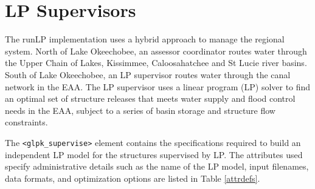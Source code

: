 \section{LP Supervisors}

The runLP implementation uses a hybrid approach to manage the regional
system. North of Lake Okeechobee, an assessor coordinator routes water
through the Upper Chain of Lakes, Kissimmee, Caloosahatchee and St
Lucie river basins.  South of Lake Okeechobee, an LP supervisor routes
water through the canal network in the EAA.  The LP supervisor uses a
linear program (LP) solver to find an optimal set of structure
releases that meets water supply and flood control needs in the EAA,
subject to a series of basin storage and structure flow constraints.

The {\tt <glpk\_supervise>} element contains the specifications
required to build an independent LP model for the structures
supervised by LP.  The attributes used specify administrative details
such as the name of the LP model, input filenames, data formats, and
optimization options are listed in Table \ref {attrdefs}.

